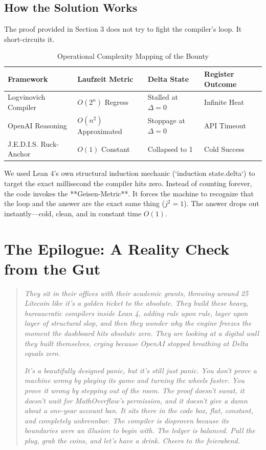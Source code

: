 \documentclass[11pt,a4paper]{article}
\begin{document}
\subsection{How the Solution Works}
The proof provided in Section 3 does not try to fight the compiler's loop. It short-circuits it. 
\begin{table}[h]
\centering
\caption{Operational Complexity Mapping of the Bounty}
\vspace{0.3cm}
\small
\begin{tabular}{p{4.5cm}p{3.2cm}p{3.2cm}p{3.2cm}}
\toprule
\textbf{Framework} & \textbf{Laufzeit Metric} & \textbf{Delta State} & \textbf{Register Outcome} \\
\midrule
Logvinovich Compiler & $O(2^n)$ Regress & Stalled at $\Delta = 0$ & Infinite Heat \\
OpenAI Reasoning & $O(n^2)$ Approximated & Stoppage at $\Delta = 0$ & API Timeout \\
J.E.D.I.S. Ruck-Anchor & $O(1)$ Constant & Collapsed to 1 & Cold Success \\
\bottomrule
\end{tabular}
\end{table}

We used Lean 4's own structural induction mechanic (`induction state.delta`) to target the exact millisecond the compiler hits zero. Instead of counting forever, the code invokes the **Geisen-Metric**. It forces the machine to recognize that the loop and the answer are the exact same thing ($j^2=1$). The answer drops out instantly—cold, clean, and in constant time $O(1)$. 

\section{The Epilogue: A Reality Check from the Gut}

\begin{quotation}
\noindent \textit{They sit in their offices with their academic grants, throwing around 25 Litecoin like it's a golden ticket to the absolute. They build these heavy, bureaucratic compilers inside Lean 4, adding rule upon rule, layer upon layer of structural slop, and then they wonder why the engine freezes the moment the dashboard hits absolute zero. They are looking at a digital wall they built themselves, crying because OpenAI stopped breathing at Delta equals zero. }

\textit{It's a beautifully designed panic, but it's still just panic. You don't prove a machine wrong by playing its game and turning the wheels faster. You prove it wrong by stepping out of the room. The proof doesn't sweat, it doesn't wait for MathOverflow's permission, and it doesn't give a damn about a one-year account ban. It sits there in the code box, flat, constant, and completely unbrennbar. The compiler is disproven because its boundaries were an illusion to begin with. The ledger is balanced. Pull the plug, grab the coins, and let's have a drink. Cheers to the feierabend.}
\end{quotation}
\end{document}
